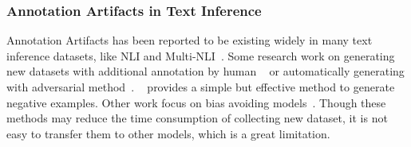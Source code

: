\subsubsection*{Annotation Artifacts in Text Inference}
Annotation Artifacts has been reported to be existing widely in many text 
inference datasets, like NLI and Multi-NLI~\cite{gururangan2018annotation}.
Some research work on generating new datasets with additional annotation by human
~\cite{sharma2018tackling} or automatically generating with adversarial method~\cite{zellers2018swag}. 
~\cite{roemmele2017rnn} provides a simple but effective method to generate negative examples. 
Other work focus on bias avoiding models~\cite{clark2019don,zhao2018gender}. Though these methods 
may reduce the time consumption of collecting new dataset, it is not easy to transfer them to other models, which 
is a great limitation.






